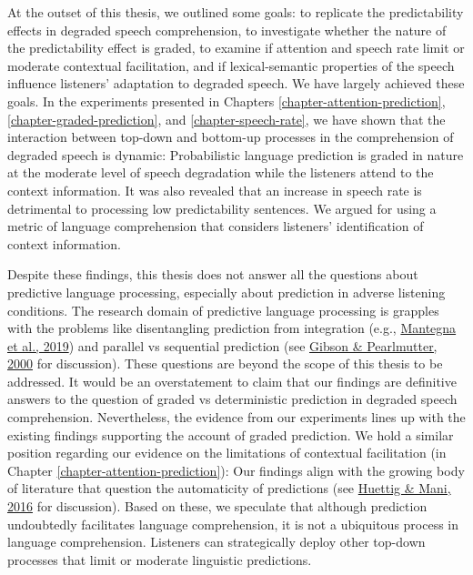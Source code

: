\documentclass[a4paper, nobind]{templates/ociamthesis}
\begin{document}
At the outset of this thesis, we outlined some goals:
to replicate the predictability effects in degraded speech comprehension,
to investigate whether the nature of the predictability effect is graded,
to examine if attention and speech rate limit or moderate contextual facilitation,
and if lexical-semantic properties of the speech influence listeners' adaptation to degraded speech.
We have largely achieved these goals.
In the experiments presented in Chapters \ref{chapter-attention-prediction}, \ref{chapter-graded-prediction}, and \ref{chapter-speech-rate}, we have shown that the interaction between top-down and bottom-up processes in the comprehension of degraded speech is dynamic:
Probabilistic language prediction is graded in nature at the moderate level of speech degradation while the listeners attend to the context information.
It was also revealed that an increase in speech rate is detrimental to processing low predictability sentences.
We argued for using a metric of language comprehension that considers listeners' identification of context information.

Despite these findings, this thesis does not answer all the questions about predictive language processing, especially about prediction in adverse listening conditions.
The research domain of predictive language processing is grapples with the problems like disentangling prediction from integration (e.g., \protect\hyperlink{ref-Mantegna2019}{Mantegna et al., 2019}) and
parallel vs sequential prediction (see \protect\hyperlink{ref-Gibson2000}{Gibson \& Pearlmutter, 2000} for discussion).
These questions are beyond the scope of this thesis to be addressed.
It would be an overstatement to claim that our findings are definitive answers to the question of graded vs deterministic prediction in degraded speech comprehension.
Nevertheless, the evidence from our experiments lines up with the existing findings supporting the account of graded prediction.
We hold a similar position regarding our evidence on the limitations of contextual facilitation (in Chapter \ref{chapter-attention-prediction}):
Our findings align with the growing body of literature that question the automaticity of predictions (see \protect\hyperlink{ref-Huettig2016}{Huettig \& Mani, 2016} for discussion).
Based on these, we speculate that although prediction undoubtedly facilitates language comprehension,
it is not a ubiquitous process in language comprehension.
Listeners can strategically deploy other top-down processes that limit or moderate linguistic predictions.
\end{document}
